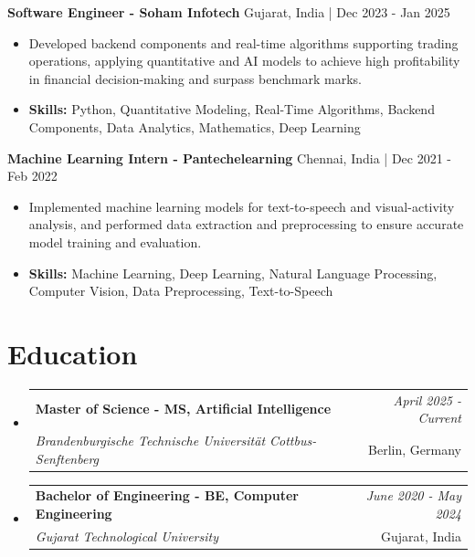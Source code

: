 \documentclass[a4paper,11pt]{article}
\makeatletter
\newcommand{\resumeSubheading}[4]{
\vspace{0.5mm}\item
    \begin{tabular*}{\linewidth}[t]{l@{\extracolsep{\fill}}r}
        \textbf{#1} & \textit{\footnotesize{#4}} \\
        \textit{\footnotesize{#3}} &  \footnotesize{#2}\\
    \end{tabular*}
    \vspace{-2.4mm}
}
\makeatother
\begin{document}
\vspace{1mm}
  \textbf{Software Engineer - Soham Infotech} \hfill Gujarat, India | Dec 2023 - Jan 2025
\vspace{-1.5mm} %
\begin{itemize}
  \item Developed backend components and real-time algorithms supporting trading operations, applying quantitative and AI models to achieve high profitability in financial decision-making and surpass benchmark marks.

\vspace{-2mm}
  \item \textbf{Skills:} Python, Quantitative Modeling, Real-Time Algorithms, Backend Components, Data Analytics, Mathematics, Deep Learning
\end{itemize}

\vspace{1mm}
  \textbf{Machine Learning Intern - Pantechelearning} \hfill Chennai, India | Dec 2021 - Feb 2022
\vspace{-1.5mm} %
\begin{itemize}
  \item Implemented machine learning models for text-to-speech and visual-activity analysis, and performed data extraction and preprocessing to ensure accurate model training and evaluation.
\vspace{-2mm}
  \item \textbf{Skills:} Machine Learning, Deep Learning, Natural Language Processing, Computer Vision, Data Preprocessing, Text-to-Speech
\end{itemize}\section{\textbf{Education}}
\vspace{-0.4mm}

\begin{itemize}[leftmargin=0.15in, label={}]
\resumeSubheading
{Master of Science - MS, Artificial Intelligence }{Berlin, Germany}
{Brandenburgische Technische Universität Cottbus-Senftenberg  }{April 2025 - Current}

\vspace{1.0mm} %
\resumeSubheading
{Bachelor of Engineering - BE, Computer Engineering  }{Gujarat, India}
{Gujarat Technological University }{June 2020 - May 2024}

\end{itemize}
\end{document}
